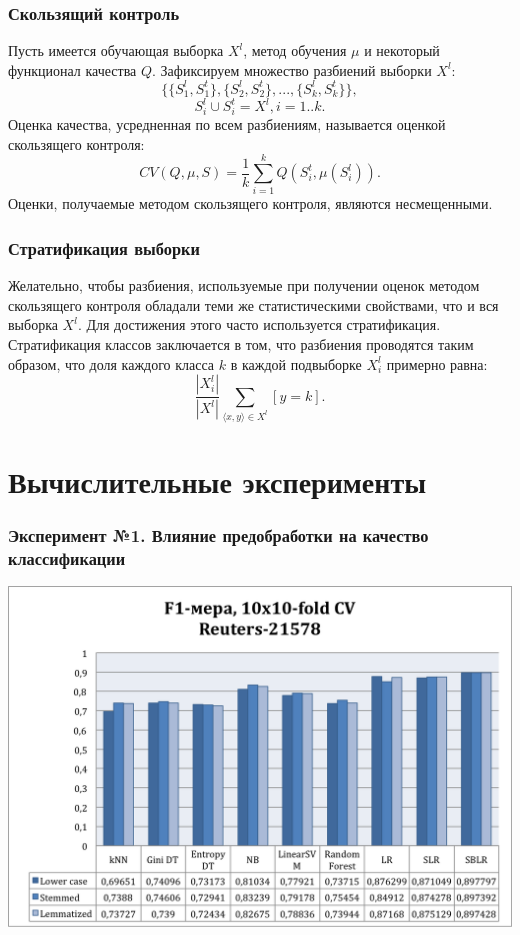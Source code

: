 \documentclass{beamer}
\begin{document}
\begin{frame}
\frametitle{Скользящий контроль}
	Пусть имеется обучающая выборка $X^l$, метод обучения $\mu$ и некоторый функционал качества $Q$. Зафиксируем множество разбиений выборки $X^l$:
	$$\{\{S_1^l,S_1^t\},\{S_2^l,S_2^t\},...,\{S_k^l,S_k^t\}\},$$
	$$S_i^l \cup S_i^t = X^l, i=1..k.$$
	Оценка качества, усредненная по всем разбиениям, называется оценкой скользящего контроля:
	$$CV(Q,\mu,S)=\frac{1}{k}\sum\limits_{i=1}^{k}Q(S_i^t,\mu(S_i^l)).$$
	Оценки, получаемые методом скользящего контроля, являются несмещенными.
\end{frame}

\begin{frame}
\frametitle{Стратификация выборки}
	Желательно, чтобы разбиения, используемые при получении оценок методом скользящего контроля обладали теми же статистическими свойствами, что и вся выборка $X^l$. Для достижения этого часто используется стратификация.
	\newline
	\newline
	Стратификация классов заключается в том, что разбиения проводятся таким образом, что доля каждого класса $k$ в каждой подвыборке $X_i^l$ примерно равна:
	$$\frac{|X_i^l|}{|X^l|}\sum\limits_{\langle x,y \rangle \in X^l}^{}[y=k].$$
\end{frame}

\section{Вычислительные эксперименты}
\begin{frame}
\end{frame}

\begin{frame}
\frametitle{Эксперимент №1. Влияние предобработки на качество классификации}
\begin{center}
    \includegraphics[width=\linewidth,height=0.7\textheight,align=\center,keepaspectratio, trim=4 4 4 4, clip]{reuters-preprocessing.png}
\end{center}
\end{frame}
\end{document}
